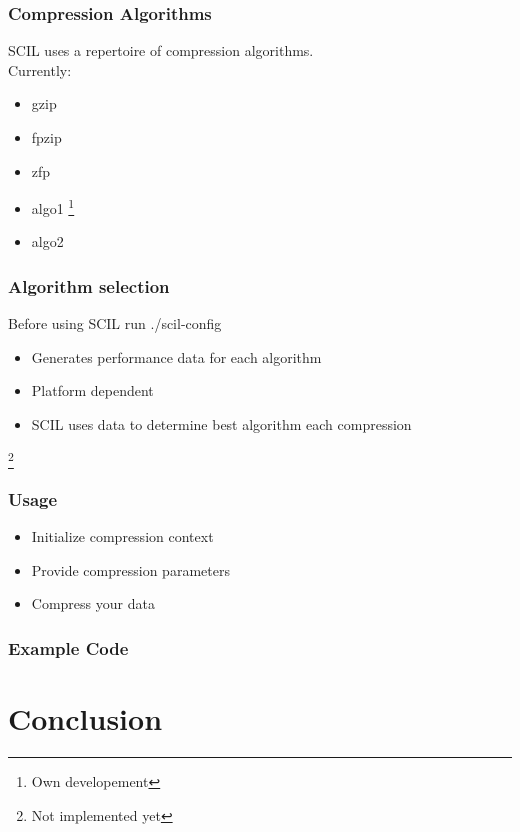 \documentclass[compress]{beamer}
\begin{document}
\begin{frame}
	\frametitle{Compression Algorithms}

	SCIL uses a repertoire of compression algorithms.\\
	Currently:

	\bigskip

	\begin{itemize}
		\item gzip
		\item fpzip
		\item zfp
		\item algo1 \footnote{Own developement}
		\item algo2 \footnotemark[\value{footnote}]
	\end{itemize}

	\setcounter{footnote}{0}
\end{frame}

\begin{frame}
	\frametitle{Algorithm selection}

	Before using SCIL run ./scil-config

	\bigskip

	\begin{itemize}
		\item Generates performance data for each algorithm
		\item Platform dependent
		\item SCIL uses data to determine best algorithm each compression
	\end{itemize}

	\footnote{Not implemented yet}
\end{frame}

\begin{frame}
	\frametitle{Usage}

	\begin{itemize}
		\item Initialize compression context
		\item Provide compression parameters
		\item Compress your data
	\end{itemize}
\end{frame}

\begin{frame}
	\frametitle{Example Code}

\end{frame}

\section{Conclusion}
\end{document}
